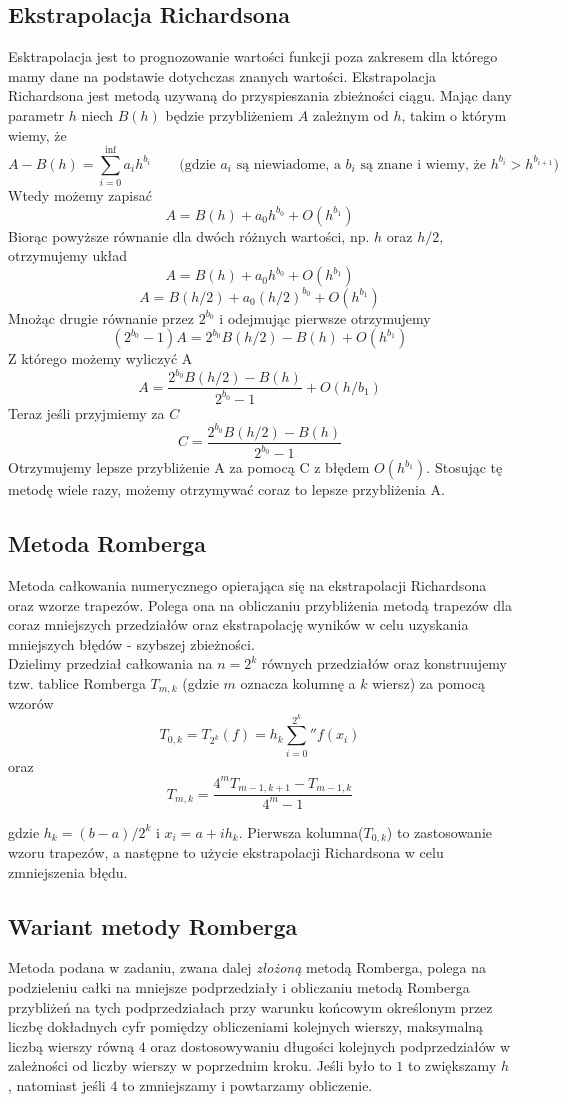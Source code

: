 \documentclass[11pt,leqno]{article}
\begin{document}
\subsection{Ekstrapolacja Richardsona}\label{SS:EkstrapolacjaRichardsona}
Esktrapolacja jest to prognozowanie wartości funkcji poza zakresem dla którego
mamy dane na podstawie dotychczas znanych wartości. Ekstrapolacja Richardsona
jest metodą uzywaną do przyspieszania zbieżności ciągu. Mając dany parametr $h$
niech $B(h)$ będzie przybliżeniem $A$ zależnym od $h$, takim o którym wiemy, że
$$
    A - B(h) = \sum_{i=0}^{\inf} a_ih^{b_i} \qquad\mbox{(gdzie $a_i$ są
    niewiadome, a $b_i$ są znane i wiemy, że $h^{b_i} > h^{b_{i+1}}$)}
$$
Wtedy możemy zapisać
$$
    A = B(h) + a_0h^{b_0} + O(h^{b_1})
$$
Biorąc powyższe równanie dla dwóch różnych wartości, np. $h$ oraz $h/2$,
otrzymujemy układ
$$
    A = B(h) + a_0h^{b_0} + O(h^{b_1})
$$
$$
    A = B(h/2) + a_0(h/2)^{b_0} + O(h^{b_1})
$$
Mnożąc drugie równanie przez $2^{b_0}$ i odejmując pierwsze otrzymujemy
$$
    (2^{b_0} - 1)A = 2^{b_0}B(h/2) - B(h) + O(h^{b_1})
$$
Z którego możemy wyliczyć A
$$
    A = \frac{2^{b_0}B(h/2) - B(h)}{2^{b_0} - 1} + O(h/{b_1})
$$
Teraz jeśli przyjmiemy za $C$
$$
    C = \frac{2^{b_0}B(h/2) - B(h)}{2^{b_0} - 1}
$$
Otrzymujemy lepsze przybliżenie A za pomocą C z błędem $O(h^{b_1})$.
Stosując tę metodę wiele razy, możemy otrzymywać coraz to lepsze przybliżenia
A.

\subsection{Metoda Romberga}\label{SS:MetodaRomberga}
Metoda całkowania numerycznego opierająca się na ekstrapolacji Richardsona oraz
wzorze trapezów. Polega ona na obliczaniu przybliżenia metodą trapezów dla
coraz mniejszych przedziałów oraz ekstrapolację wyników w celu uzyskania
mniejszych błędów - szybszej zbieżności. \\
Dzielimy przedział całkowania na $n=2^k$ równych przedziałów oraz konstruujemy
tzw. tablice Romberga $T_{m, k}$ (gdzie $m$ oznacza kolumnę a $k$ wiersz) za
pomocą wzorów
$$
    T_{0, k} = T_{2^k}(f) = h_k\sum_{i=0}^{2^k}'' f(x_i)
$$
oraz
$$
    T_{m, k} = \frac{4^mT_{m-1, k+1} - T_{m-1, k}}{4^m - 1}
$$

gdzie $h_k = (b - a) / 2^k$ i $x_i = a + ih_k$.
Pierwsza kolumna($T_{0, k}$) to zastosowanie wzoru trapezów, a następne to użycie
ekstrapolacji Richardsona w celu zmniejszenia błędu.

\subsection{Wariant metody Romberga}\label{SS:ZlozonaMetodaRomberga}
Metoda podana w zadaniu, zwana dalej \textit{złożoną} metodą Romberga, polega
na podzieleniu całki na mniejsze podprzedziały i obliczaniu metodą Romberga
przybliżeń na tych podprzedziałach przy warunku końcowym określonym przez
liczbę dokładnych cyfr pomiędzy obliczeniami kolejnych wierszy, maksymalną
liczbą wierszy równą $4$ oraz dostosowywaniu długości kolejnych podprzedziałów
w zależności od liczby wierszy w poprzednim kroku. Jeśli było to $1$ to
zwiększamy $h$, natomiast jeśli $4$ to zmniejszamy i powtarzamy obliczenie.
\end{document}
